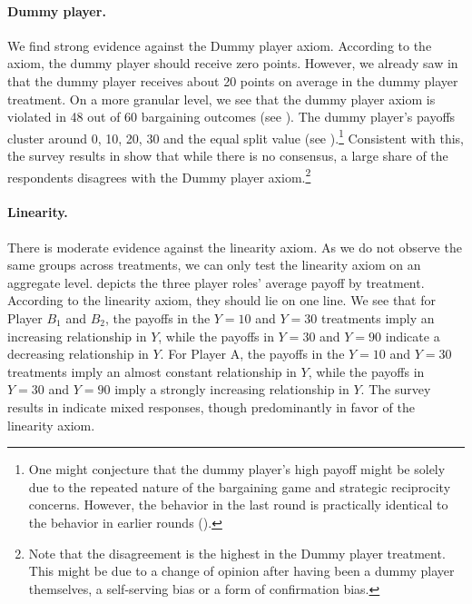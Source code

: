 \paragraph{Dummy player.} We find strong evidence against the Dummy player axiom. According to the axiom, the dummy player should receive zero points. However, we already saw in  that the dummy player receives about 20 points on average in the dummy player treatment. On a more granular level, we see that the dummy player axiom is violated in 48 out of 60 bargaining outcomes (see ). The dummy player's payoffs cluster around 0, 10, 20, 30 and the equal split value (see ).\footnote{One might conjecture that the dummy player's high payoff might be solely due to the repeated nature of the bargaining game and strategic reciprocity concerns. However, the behavior in the last round is practically identical to the behavior in earlier rounds ().}
Consistent with this, the survey results in  show that while there is no consensus, a large share of the respondents disagrees with the Dummy player axiom.\footnote{Note that the disagreement is the highest in the Dummy player treatment. This might be due to a change of opinion after having been a dummy player themselves, a self-serving bias or a form of confirmation bias.} 

\paragraph{Linearity.}
There is moderate evidence against the linearity axiom. As we do not observe the same groups across treatments, we can only test the linearity axiom on an aggregate level.  depicts the three player roles' average payoff by treatment. According to the linearity axiom, they should lie on one line. We see that for Player $B_1$ and $B_2$, the payoffs in the $Y=10$ and $Y=30$ treatments imply an increasing relationship in $Y$, while the payoffs in $Y=30$ and $Y=90$ indicate a decreasing relationship in $Y$. For Player A, the payoffs in the $Y=10$ and $Y=30$ treatments imply an almost constant relationship in $Y$, while the payoffs in $Y=30$ and $Y=90$ imply a strongly increasing relationship in $Y$.
The survey results in  indicate mixed responses, though predominantly in favor of the linearity axiom.


